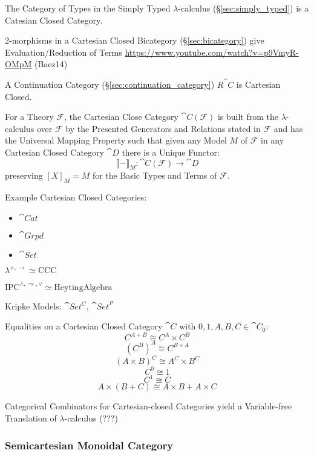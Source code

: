 The Category of Types in the Simply Typed $\lambda$-calculus
(\S\ref{sec:simply_typed}) is a Catesian Closed Category.

2-morphisms in a Cartesian Closed Bicategory (\S\ref{sec:bicategory})
give Evaluation/Reduction of Terms
\url{https://www.youtube.com/watch?v=p9VmyR-OMpM} (Baez14)

A Continuation Category (\S\ref{sec:continuation_category})
$R^\cat{C}$ is Cartesian Closed.

For a Theory $\mathcal{F}$, the Cartesian Close Category
$\cat{C}(\mathcal{F})$ is built from the $\lambda$-calculus over
$\mathcal{F}$ by the Presented Generators and Relations stated in
$\mathcal{F}$ and has the Universal Mapping Property such that given
any Model $M$ of $\mathcal{F}$ in any Cartesian Closed Category
$\cat{D}$ there is a Unique Functor:
\[
  \llbracket - \rrbracket_M :
    \cat{C}(\mathcal{F}) \rightarrow \cat{D}
\]
preserving $[X]_M = M$ for the Basic Types and Terms of $\mathcal{F}$.
\cite{awodey06}

Example Cartesian Closed Categories:
\begin{itemize}
\item $\cat{Cat}$
\item $\cat{Grpd}$
\item $\cat{Set}$
\end{itemize}

$\lambda^{\times, \rightarrow} \simeq \mathrm{CCC}$

$\mathrm{IPC}^{\wedge, \Rightarrow, \vee} \simeq \mathrm{Heyting Algebra}$

Kripke Models: $\cat{Set^C}$, $\cat{Set}^P$ %

Equalities on a Cartesian Closed Category $\cat{C}$ with
$0,1,A,B,C \in \cat{C}_0$:
\[
  C^{A + B} \cong C^A \times C^B
\]\[
  (C^B)^A \cong C^{B \times A}
\]\[
  (A \times B)^C \cong A^C \times B^C
\]\[
  C^0 \cong 1
\]\[
  C^1 \cong C
\]\[
  A \times (B + C) \cong A \times B + A \times C
\]

Categorical Combinators for Cartesian-closed Categories yield a
Variable-free Translation of $\lambda$-calculus (???)



\subsubsection{Semicartesian Monoidal Category}
\label{sec:semicartesian_monoidal}

